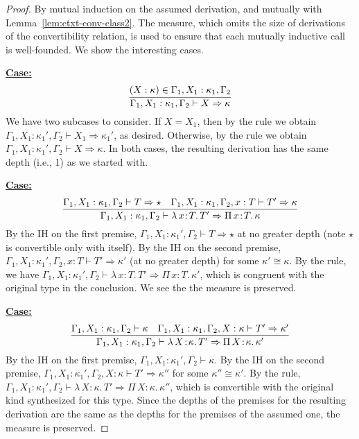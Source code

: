 \documentclass{article}
\newcommand{\abs}[4]{{#1}\, #2\! : \! #3.\, #4}
\newcommand{\tpsynth}[0]{\Rightarrow}
\newcommand{\startcase}[1]{\vspace{#1} \noindent\textbf{\underline{Case:}}}
\begin{document}
\begin{proof}
  By mutual induction on the assumed derivation, and mutually with
  Lemma~\ref{lem:ctxt-conv-class2}.
  The measure, which omits the size of derivations of the convertibility
  relation, is used to ensure that each mutually inductive call is well-founded.
  We show the interesting cases.

  \startcase{.2cm}
  \[
    \infer{\Gamma_1,X_1:\kappa_1,\Gamma_2 \vdash X \tpsynth \kappa}{(X : \kappa) \in \Gamma_1,X_1:\kappa_1,\Gamma_2}
  \]
  We have two subcases to consider.
  If \(X = X_1\), then by the rule we obtain \(\Gamma_1,X_1:\kappa_1',\Gamma_2
  \vdash X_1 \tpsynth \kappa_1'\), as desired.
  Otherwise, by the rule we obtain \(\Gamma_1,X_1:\kappa_1',\Gamma_2
  \vdash X \tpsynth \kappa\).
  In both cases, the resulting derivation has the same depth (i.e., 1) as we
  started with.

  \startcase{.2cm}
  \[
    \infer{
      \Gamma_1,X_1:\kappa_1,\Gamma_2 \vdash\abs{\lambda}{x}{T}{T'} \tpsynth
      \abs{\Pi}{x}{T}{\kappa}
    }{
      \Gamma_1,X_1:\kappa_1,\Gamma_2 \vdash T \tpsynth \star
      & \Gamma_1,X_1:\kappa_1,\Gamma_2 ,x:T\vdash T'\tpsynth\kappa
    }
  \]
  By the IH on the first premise, \(\Gamma_1,X_1:\kappa_1',\Gamma_2 \vdash T
  \tpsynth \star\) at no greater depth (note \(\star\) is convertible only with
  itself).
  By the IH on the second premise, \(\Gamma_1,X_1:\kappa_1',\Gamma_2,x:T \vdash
  T' \tpsynth \kappa'\) (at no greater depth) for some \(\kappa' \cong \kappa\).
  By the rule, we have \(\Gamma_1,X_1:\kappa_1',\Gamma_2 \vdash
  \abs{\lambda}{x}{T}{T'} \tpsynth \abs{\Pi}{x}{T}{\kappa'}\), which is
  congruent with the original type in the conclusion.
  We see the the measure is preserved.
  
  
  \startcase{.2cm}
  \[
    \infer{
      \Gamma_1,X_1:\kappa_1,\Gamma_2 \vdash \abs{\lambda}{X}{\kappa}{T'} \tpsynth
      \abs{\Pi}{X}{\kappa}{\kappa'}
    }{
      \Gamma_1,X_1:\kappa_1,\Gamma_2 \vdash \kappa
      & \Gamma_1,X_1:\kappa_1,\Gamma_2,X:\kappa \vdash  T' \tpsynth \kappa'
    }
  \]
  By the IH on the first premise, \(\Gamma_1,X_1:\kappa_1',\Gamma_2 \vdash
  \kappa\).
  By the IH on the second premise, \(\Gamma_1,X_1:\kappa_1',\Gamma_2,X:\kappa
  \vdash T' \tpsynth \kappa''\) for some \(\kappa'' \cong \kappa'\).
  By the rule, \(\Gamma_1,X_1:\kappa_1',\Gamma_2 \vdash
  \abs{\lambda}{X}{\kappa}{T'} \tpsynth \abs{\Pi}{X}{\kappa}{\kappa''}\), which
  is convertible with the original kind synthesized for this type.
  Since the depths of the premises for the resulting derivation are the same as
  the depths for the premises of the assumed one, the measure is preserved.


\end{proof}
\end{document}
